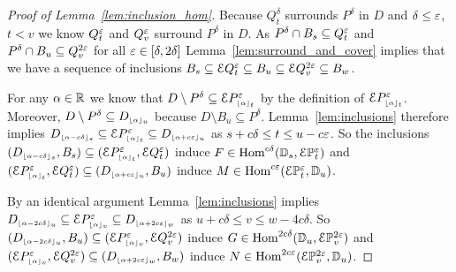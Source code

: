\begin{proof}[Proof of Lemma~\ref{lem:inclusion_hom}]
  Because $Q_t^\delta$ surrounds $P^\delta$ in $D$ and $\delta\leq\e$, $t < v$ we know $Q_t^\e$ and $Q_v^\e$ surround $P^\delta$ in $D$.
  As $P^\delta\cap B_s\subseteq Q_t^\e$ and $P^\delta\cap B_u\subseteq Q_v^{2\e}$ for all $\e\in[\delta,2\delta]$ Lemma~\ref{lem:surround_and_cover} implies that we have a sequence of inclusions $B_s\subseteq \E Q_t^\e\subseteq B_u\subseteq \E Q_v^{2\e}\subseteq B_w$.

  For any $\alpha\in\R$ we know that $D\setminus P^\delta \subseteq \ext{P\subi{t}{\alpha}^\e}$ by the definition of $\ext{P\subi{t}{\alpha}^\e}$.
  Moreover, $D\setminus P^\delta\subseteq D\subi{u}{\alpha}$ because $D\setminus B_u\subseteq P^\delta$.
  Lemma~\ref{lem:inclusions} therefore implies $D\subi{s}{\alpha-c\delta}\subseteq \E P\subi{t}{\alpha}^\e\subseteq D\subi{u}{\alpha+c\e}$ as $s + c\delta\leq t \leq u - c\e$.
  So the inclusions $(D\subi{s}{\alpha-c\delta}, B_s)\subseteq (\E P\subi{t}{\alpha}^\e, \E Q_t^\e)$ induce $F\in\Hom^{c\delta}(\DD{s},\E\PP{t}{\e})$ and $(\E P\subi{t}{\alpha}^\e, \E Q_t^\e)\subseteq (D\subi{u}{\alpha+c\e}, B_u)$ induce $M\in \Hom^{c\e}(\E\PP{t}{\e}, \DD{u})$.

  By an identical argument Lemma~\ref{lem:inclusions} implies $D\subi{u}{\alpha-2c\delta}\subseteq \E P\subi{v}{\alpha}^\e\subseteq D\subi{w}{\alpha+2c\e}$ as $u+c\delta\leq v\leq w-4c\delta$.
  So $(D\subi{u}{\alpha-2c\delta},B_u)\subseteq (\E P\subi{v}{\alpha}^\e, \E Q_v^{2\e})$ induce $G\in\Hom^{2c\delta}(\DD{u},\E\PP{v}{2\e})$ and $(\E P\subi{v}{\alpha}^\e, \E Q_v^{2\e})\subseteq (D\subi{w}{\alpha+2c\e},B_w)$ induce $N\in\Hom^{2c\e}(\E\PP{v}{2\e},\DD{u})$.
\end{proof}

